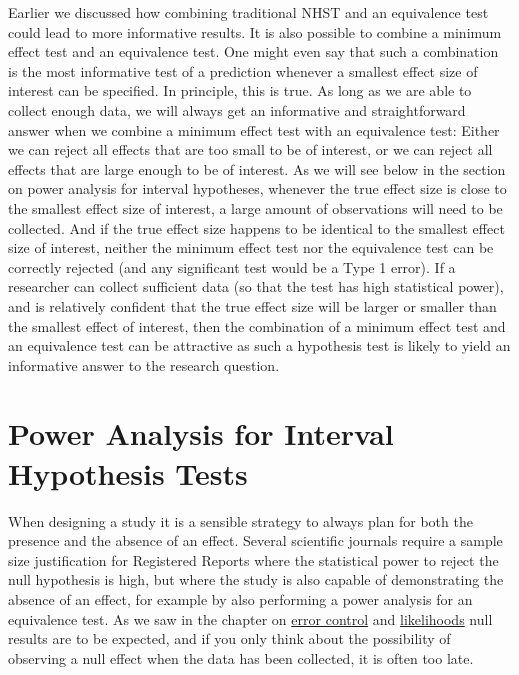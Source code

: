 \documentclass[
  oneside]{krantz}
\begin{document}
Earlier we discussed how combining traditional NHST and an equivalence test could lead to more informative results. It is also possible to combine a minimum effect test and an equivalence test. One might even say that such a combination is the most informative test of a prediction whenever a smallest effect size of interest can be specified. In principle, this is true. As long as we are able to collect enough data, we will always get an informative and straightforward answer when we combine a minimum effect test with an equivalence test: Either we can reject all effects that are too small to be of interest, or we can reject all effects that are large enough to be of interest. As we will see below in the section on power analysis for interval hypotheses, whenever the true effect size is close to the smallest effect size of interest, a large amount of observations will need to be collected. And if the true effect size happens to be identical to the smallest effect size of interest, neither the minimum effect test nor the equivalence test can be correctly rejected (and any significant test would be a Type 1 error). If a researcher can collect sufficient data (so that the test has high statistical power), and is relatively confident that the true effect size will be larger or smaller than the smallest effect of interest, then the combination of a minimum effect test and an equivalence test can be attractive as such a hypothesis test is likely to yield an informative answer to the research question.

\hypertarget{power-analysis-for-interval-hypothesis-tests}{%
\section{Power Analysis for Interval Hypothesis Tests}\label{power-analysis-for-interval-hypothesis-tests}}

When designing a study it is a sensible strategy to always plan for both the presence and the absence of an effect. Several scientific journals require a sample size justification for Registered Reports where the statistical power to reject the null hypothesis is high, but where the study is also capable of demonstrating the absence of an effect, for example by also performing a power analysis for an equivalence test. As we saw in the chapter on \protect\hyperlink{errorcontrol}{error control} and \protect\hyperlink{likelihoods}{likelihoods} null results are to be expected, and if you only think about the possibility of observing a null effect when the data has been collected, it is often too late.
\end{document}
